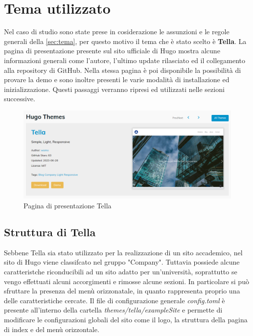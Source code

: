 \documentclass[target=bach,aauheader=]{thud}
\begin{document}
\section{Tema utilizzato}
Nel caso di studio sono state prese in cosiderazione le assunzioni e le regole generali della \cref{sec:tema}, per questo motivo il tema che è stato scelto è \textbf{Tella}.
La pagina di presentazione presente sul sito ufficiale di Hugo mostra alcune informazioni generali come l'autore, l'ultimo update rilasciato ed il collegamento alla repository di GitHub.
\newline
Nella stessa pagina è poi disponibile la possibilità di provare la demo e sono inoltre presenti le varie modalità di installazione ed inizializzazione. Questi passaggi verranno ripresi ed utilizzati nelle sezioni successive.

\begin{figure}
    \centering
    \includegraphics[width = 1\textwidth]{images/Tella.png}
    \caption{Pagina di presentazione Tella}
\end{figure}


\subsection{Struttura di Tella}
Sebbene Tella sia stato utilizzato per la realizzazione di un sito accademico, nel sito di Hugo viene classifcato nel gruppo "Company". Tuttavia possiede alcune caratteristche riconducibili ad un sito adatto per un'università, soprattutto se vengo effettuati alcuni accorgimenti
e rimosse alcune sezioni. 
In particolare si può sfruttare la presenza del menù orizzonatale, in quanto rappresenta proprio una delle caratteristiche cercate. 
\newline
Il file di configurazione generale \textit{config.toml} è presente all'interno della cartella \textit{themes/tella/exampleSite} e permette di modificare le configurazioni globali del sito come il logo, la struttura della pagina di index e del menù orizzontale.
\end{document}
